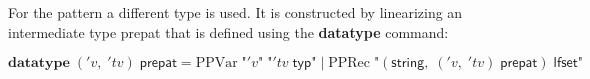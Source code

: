     For the pattern a different type is used. It is constructed by linearizing an intermediate type \textsf{prepat} that is defined using the \textbf{datatype} command:
    
    \begin{equation*}
      \textbf{datatype}\; ('v,\; 'tv)\; \textsf{prepat} = \text{PPVar}\; \text{"}'v\text{"}\; \text{"}'tv\; \textsf{typ}\text{"}\; |\; \text{PPRec}\; \text{"}(\textsf{string},\; ('v,\; 'tv)\; \textsf{prepat})\; \textsf{lfset}\text{"}
    \end{equation*}


